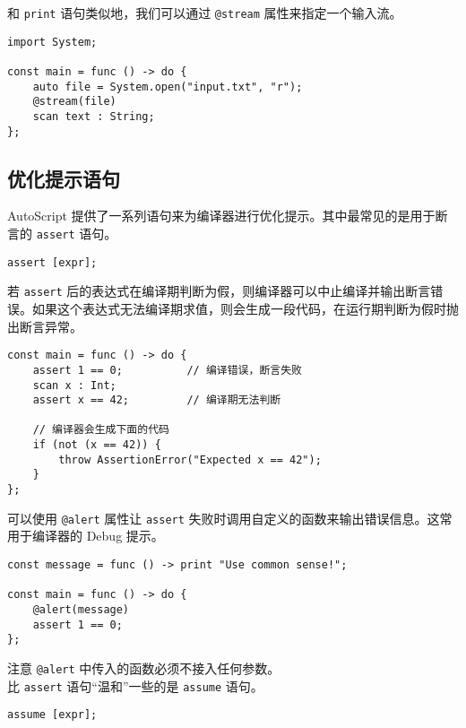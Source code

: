 和 \lstinline!print! 语句类似地，我们可以通过 \lstinline!@stream! 属性来指定一个输入流。

\begin{lstlisting}
import System;

const main = func () -> do {
    auto file = System.open("input.txt", "r");
    @stream(file)
    scan text : String;
};
\end{lstlisting}

\subsection{优化提示语句}

AutoScript 提供了一系列语句来为编译器进行优化提示。其中最常见的是用于断言的 \lstinline!assert! 语句。

\begin{grammar} \label{grm:assert-statement}
    \lstinline!assert [expr];! 
\end{grammar}

若 \lstinline!assert! 后的表达式在编译期判断为假，则编译器可以中止编译并输出断言错误。如果这个表达式无法编译期求值，则会生成一段代码，在运行期判断为假时抛出断言异常。

\begin{lstlisting}
const main = func () -> do {
    assert 1 == 0;          // 编译错误，断言失败
    scan x : Int;
    assert x == 42;         // 编译期无法判断

    // 编译器会生成下面的代码
    if (not (x == 42)) {
        throw AssertionError("Expected x == 42");
    }
};
\end{lstlisting}

可以使用 \lstinline!@alert! 属性让 \lstinline!assert! 失败时调用自定义的函数来输出错误信息。这常用于编译器的 Debug 提示。

\begin{lstlisting}
const message = func () -> print "Use common sense!";

const main = func () -> do {
    @alert(message)
    assert 1 == 0;
};
\end{lstlisting}

注意 \lstinline!@alert! 中传入的函数必须不接入任何参数。 \\

比 \lstinline!assert! 语句“温和”一些的是 \lstinline!assume! 语句。

\begin{grammar} \label{grm:assume-statement}
    \lstinline!assume [expr];!
\end{grammar}

